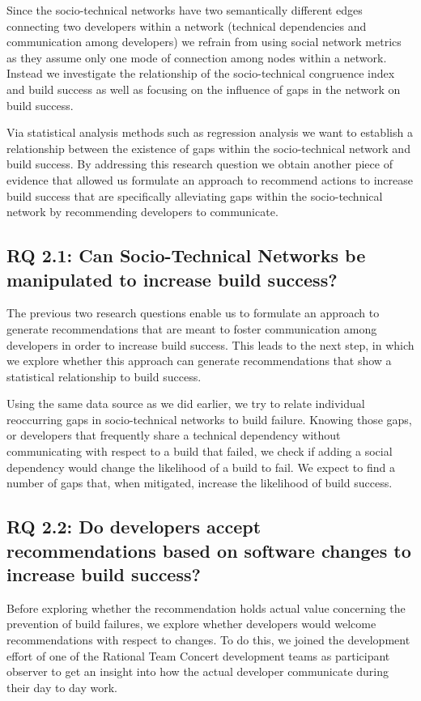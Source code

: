 Since the socio-technical networks have two semantically different edges connecting two developers within a network (technical dependencies and communication among developers) we refrain from using social network metrics as they assume only one mode of connection among nodes within a network.
Instead we investigate the relationship of the socio-technical congruence index and build success as well as focusing on the influence of gaps in the network on build success.

Via statistical analysis methods such as regression analysis we want to establish a relationship between the existence of gaps within the socio-technical network and build success.
By addressing this research question we obtain another piece of evidence that allowed us formulate an approach to recommend actions to increase build success that are specifically alleviating gaps within the socio-technical network by recommending developers to communicate.

\subsection{%
RQ 2.1: Can Socio-Technical Networks be manipulated to increase build success?}
The previous two research questions enable us to formulate an approach to generate recommendations that are meant to foster communication among developers in order to increase build success.
This leads to the next step, in which we explore whether this approach can generate recommendations that show a statistical relationship to build success.

Using the same data source as we did earlier, we try to relate individual reoccurring gaps in socio-technical networks to build failure.
Knowing those gaps, or developers that frequently share a technical dependency without communicating with respect to a build that failed, we check if adding a social dependency would change the likelihood of a build to fail.
We expect to find a number of gaps that, when mitigated, increase the likelihood of build success.

\subsection{%
  RQ 2.2: Do developers accept recommendations based on software changes to increase build success?}
Before exploring whether the recommendation holds actual value concerning the prevention of build failures, we explore whether developers would welcome recommendations with respect to changes.
To do this, we joined the development effort of one of the Rational Team Concert development teams as participant observer to get an insight into how the actual developer communicate during their day to day work.

